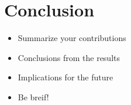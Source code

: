 \section{Conclusion}

\begin{itemize}
\item Summarize your contributions
\item Conclusions from the results
\item Implications for the future 
\item Be breif!
\end{itemize}

